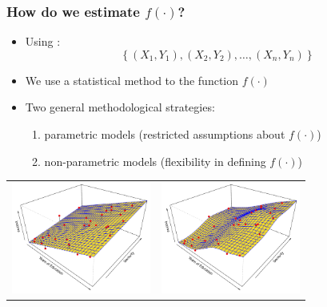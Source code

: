 \documentclass[flegn]{beamer}
\begin{document}
\begin{frame}
\frametitle{How do we estimate $f(\cdot)$?}
\begin{itemize}
\item Using {\color{red}{\it training data}}:
$$
\left\{ (X_1, Y_1), (X_2,Y_2), \dots, (X_n,Y_n) \right\}
$$
\item We use a statistical method to {\color{red}{\it estimate}} the function $f(\cdot)$
\item Two general methodological strategies:
\begin{enumerate}
\item parametric models (restricted assumptions about $f(\cdot)$)
\item non-parametric models (flexibility in defining $f(\cdot)$)
\end{enumerate}
\end{itemize}
\begin{tabular}{lr}
\includegraphics[width=1.8in]{Gareth2-4.pdf}&\includegraphics[width=1.8in]{Gareth2-5.pdf}
\end{tabular}
\end{frame}
\end{document}
